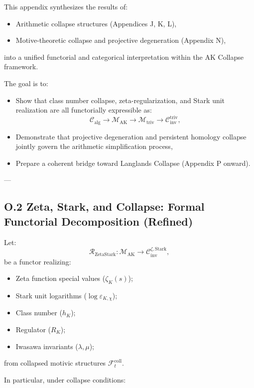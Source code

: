 \documentclass[11pt]{article}
\begin{document}
This appendix synthesizes the results of:
\begin{itemize}
  \item Arithmetic collapse structures (Appendices J, K, L),
  \item Motive-theoretic collapse and projective degeneration (Appendix N),
\end{itemize}
into a unified functorial and categorical interpretation within the AK Collapse framework.

The goal is to:
\begin{itemize}
  \item Show that class number collapse, zeta-regularization, and Stark unit realization are all functorially expressible as:
  \[
  \mathcal{C}_{\mathrm{alg}} \longrightarrow \mathcal{M}_{\mathrm{AK}} \longrightarrow \mathcal{M}_{\mathrm{triv}} \longrightarrow \mathcal{C}_{\mathrm{inv}}^{\mathrm{triv}},
  \]
  \item Demonstrate that projective degeneration and persistent homology collapse jointly govern the arithmetic simplification process,
  \item Prepare a coherent bridge toward Langlands Collapse (Appendix P onward).
\end{itemize}

---

\subsection*{O.2 Zeta, Stark, and Collapse: Formal Functorial Decomposition (Refined)}

Let:
\[
\mathcal{R}_{\mathrm{ZetaStark}} : \mathcal{M}_{\mathrm{AK}} \longrightarrow \mathcal{C}_{\mathrm{inv}}^{\zeta, \mathrm{Stark}},
\]
be a functor realizing:

\begin{itemize}
  \item Zeta function special values (\( \zeta_K(s) \));
  \item Stark unit logarithms (\( \log \varepsilon_{K,\chi} \));
  \item Class number (\( h_K \));
  \item Regulator (\( R_K \));
  \item Iwasawa invariants (\( \lambda, \mu \));
\end{itemize}

from collapsed motivic structures \( \mathcal{F}_t^{\mathrm{coll}} \).

In particular, under collapse conditions:
\end{document}
